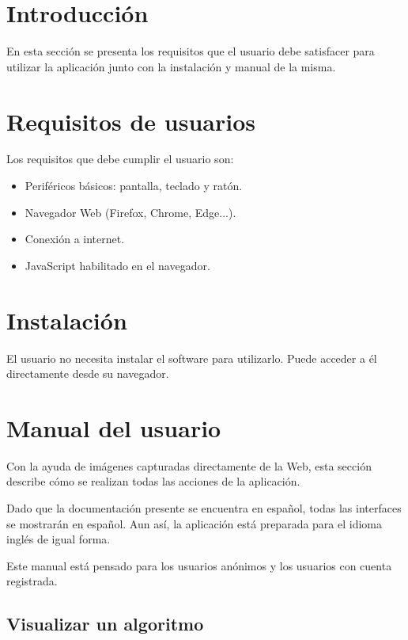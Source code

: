 
\section{Introducción}

En esta sección se presenta los requisitos que el usuario debe satisfacer para
utilizar la aplicación junto con la instalación y manual de la misma.

\section{Requisitos de usuarios}

Los requisitos que debe cumplir el usuario son:
\begin{itemize}
    \item Periféricos básicos: pantalla, teclado y ratón.
    \item Navegador Web (Firefox, Chrome, Edge...).
    \item Conexión a internet.
    \item JavaScript habilitado en el navegador.
\end{itemize}

\section{Instalación}

El usuario no necesita instalar el software para utilizarlo. Puede acceder a él
directamente desde su navegador.

\section{Manual del usuario}

Con la ayuda de imágenes capturadas directamente de la Web, esta sección
describe cómo se realizan todas las acciones de la aplicación.

Dado que la documentación presente se encuentra en español, todas las interfaces
se mostrarán en español. Aun así, la aplicación está preparada para el idioma
inglés de igual forma.

Este manual está pensado para los usuarios anónimos y los usuarios con cuenta
registrada.

\subsection{Visualizar un algoritmo}

